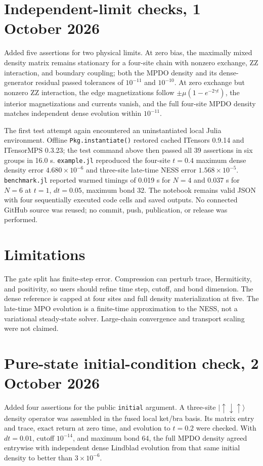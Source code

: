 \documentclass[11pt]{article}
\begin{document}
\section*{Independent-limit checks, 1 October 2026}
Added five assertions for two physical limits. At zero bias, the maximally
mixed density matrix remains stationary for a four-site chain with nonzero
exchange, ZZ interaction, and boundary coupling; both the MPDO density
and its dense-generator residual passed tolerances of $10^{-11}$ and
$10^{-10}$. At zero exchange but nonzero ZZ interaction, the edge
magnetizations follow $\pm\mu(1-e^{-2\gamma t})$, the interior
magnetizations and currents vanish, and the full four-site MPDO density
matches independent dense evolution within $10^{-11}$.

The first test attempt again encountered an uninstantiated local Julia
environment. Offline \texttt{Pkg.instantiate()} restored cached ITensors
0.9.14 and ITensorMPS 0.3.23; the test command above then passed all
39 assertions in six groups in 16.0 s. \texttt{example.jl} reproduced
the four-site $t=0.4$ maximum dense density error $4.680\times10^{-6}$
and three-site late-time NESS error $1.568\times10^{-5}$.
\texttt{benchmark.jl} reported warmed timings of 0.019 s for $N=4$
and 0.037 s for $N=6$ at $t=1$, $dt=0.05$, maximum bond 32. The notebook
remains valid JSON with four sequentially executed code cells and saved
outputs. No connected GitHub source was reused; no commit, push,
publication, or release was performed.
\section*{Limitations}
The gate split has finite-step error. Compression can perturb trace,
Hermiticity, and positivity, so users should refine time step, cutoff,
and bond dimension. The dense reference is capped at four sites and
full density materialization at five. The late-time MPO evolution is a
finite-time approximation to the NESS, not a variational steady-state
solver. Large-chain convergence and transport scaling were not claimed.
\section*{Pure-state initial-condition check, 2 October 2026}
Added four assertions for the public \texttt{initial} argument. A three-site
$|\uparrow\downarrow\uparrow\rangle$ density operator was assembled in the
fused local ket/bra basis. Its matrix entry and trace, exact return at zero
time, and evolution to $t=0.2$ were checked. With $dt=0.01$, cutoff
$10^{-14}$, and maximum bond 64, the full MPDO density agreed entrywise
with independent dense Lindblad evolution from that same initial density
to better than $3\times10^{-6}$.
\end{document}
